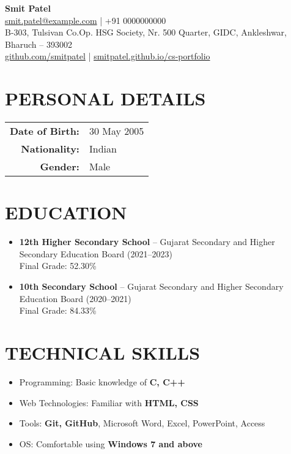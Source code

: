 \documentclass[a4paper,10pt]{article}
\newcommand{\cvsection}[1]{\section*{\uppercase{#1}}}
\begin{document}
\begin{center}
    {\LARGE \textbf{Smit Patel}}\\
    \smallskip
    \href{mailto:smit.patel@example.com}{smit.patel@example.com} | +91 0000000000\\
    B-303, Tulsivan Co.Op. HSG Society, Nr. 500 Quarter, GIDC, Ankleshwar, Bharuch – 393002\\
    \href{https://github.com/smitpatel}{github.com/smitpatel} | \href{https://smitpatel.github.io/cs-portfolio}{smitpatel.github.io/cs-portfolio}
\end{center}

\vspace{0.5cm}

\cvsection{Personal Details}
\begin{tabular}{rl}
\textbf{Date of Birth:} & 30 May 2005 \\
\textbf{Nationality:} & Indian \\
\textbf{Gender:} & Male \\
\end{tabular}

\vspace{0.5cm}

\cvsection{Education}
\begin{itemize}
    \item \textbf{12th Higher Secondary School} – Gujarat Secondary and Higher Secondary Education Board (2021–2023)\\
    Final Grade: 52.30\%
    \item \textbf{10th Secondary School} – Gujarat Secondary and Higher Secondary Education Board (2020–2021)\\
    Final Grade: 84.33\%
\end{itemize}

\vspace{0.5cm}

\cvsection{Technical Skills}
\begin{itemize}
    \item Programming: Basic knowledge of \textbf{C, C++}
    \item Web Technologies: Familiar with \textbf{HTML, CSS}
    \item Tools: \textbf{Git, GitHub}, Microsoft Word, Excel, PowerPoint, Access
    \item OS: Comfortable using \textbf{Windows 7 and above}
\end{itemize}

\vspace{0.5cm}
\end{document}
